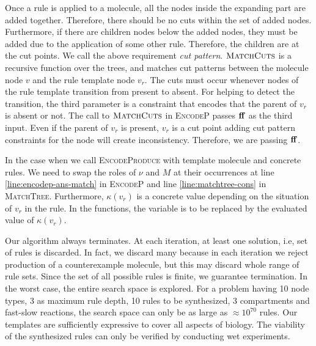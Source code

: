 Once a rule is applied to a molecule, all the
nodes inside the expanding part are added together.
Therefore, there should be no cuts within the set of added nodes.
Furthermore, if there are children nodes below the added nodes,
they must be added due to the application of some other rule.
Therefore, the children are at the cut points.
We call the above requirement {\em cut pattern}. 
$\textsc{MatchCuts}$ is a recursive function over the trees, and matches
cut patterns between the molecule node $v$ and the rule template node $v_r$.
The cuts must occur whenever nodes of the rule template transition
from present to absent.
For helping to detect the transition,
the third parameter is a constraint that encodes that the parent of $v_r$
is absent or not.
The call to $\textsc{MatchCuts}$ in \textsc{EncodeP} passes $\mathbf{ff}$ as the third input.
Even if the parent of $v_r$ is present,
$v_r$ is a cut point adding cut pattern constraints for the node will create inconsistency.
Therefore, we are passing $\mathbf{ff}$.

In the case when we call \textsc{EncodeProduce} with template molecule and
concrete rules.
We need to swap the roles of $\nu$ and $M$ at their occurrences
at line \ref{line:encodep-ans-match} in \textsc{EncodeP} and
line \ref{line:matchtree-cons} in \textsc{MatchTree}.
Furthermore, $\kappa(v_r)$ is a concrete value depending on the situation of $v_r$ in
the rule.
In the functions, the variable is to be replaced by the
evaluated value of $\kappa(v_r)$.

Our algorithm always terminates. At each iteration, at least one solution, i.e, set of
rules is discarded.
In fact, we discard many because in each iteration we reject production of a counterexample molecule, but this may discard whole range of rule sets. 
Since the set of all possible rules is finite, we
guarantee termination. In the worst case, the entire search space is explored. For a problem having 10 node types, 3 as maximum rule depth, 10 rules to be synthesized, 3 compartments
and fast-slow reactions, the search space can only be as large as $\approx 10^{70}$ rules.
Our templates are sufficiently expressive to cover all aspects of biology.
The viability of the synthesized rules can only be verified by conducting wet experiments.




